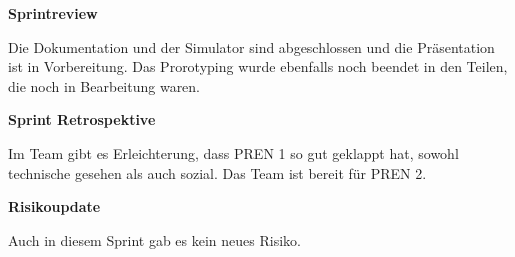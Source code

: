 \textbf{Sprintreview}

Die Dokumentation und der Simulator sind abgeschlossen und die Präsentation ist in Vorbereitung. Das Prorotyping wurde ebenfalls noch beendet in den Teilen, die noch in Bearbeitung waren.

\textbf{Sprint Retrospektive}

Im Team gibt es Erleichterung, dass PREN 1 so gut geklappt hat, sowohl technische gesehen als auch sozial. Das Team ist bereit für PREN 2.

\textbf{Risikoupdate}

Auch in diesem Sprint gab es kein neues Risiko.

